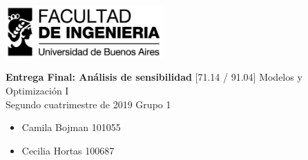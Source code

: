 \documentclass[a4paper]{article}
\newcommand{\materia}{[71.14 / 91.04] Modelos y Optimización I}
\newcommand{\trabajo}{Entrega Final: Análisis de sensibilidad}
\newcommand{\cuatrimestre}{Segundo cuatrimestre de 2019}
\newcommand{\grupo}{Grupo 1}
\begin{document}
\setcounter{page}{1}
	
\begin{titlepage}
	\hfill\includegraphics[width=6cm]{fiuba.jpg}
    \begin{center}
    \vfill
    \Huge \textbf{\trabajo}
    \vskip2cm
    \Large \materia\\
    \cuatrimestre
    \vfill
    \grupo
	\begin{itemize}
		\item Camila Bojman 101055
		\item Cecilia Hortas 100687
	\end{itemize}
    \vskip1cm
    \end{center}
\end{titlepage}
\end{document}

